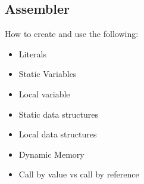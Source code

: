 \documentclass[12 pt]{article}
\begin{document}
		\subsection{Assembler}
		How to create and use the following:
		\begin{itemize}
		\item Literals
		\item Static Variables
		\item Local variable
		\item Static data structures
		\item Local data structures
		\item Dynamic Memory
		\item Call by value vs call by reference
\end{itemize}
\end{document}
